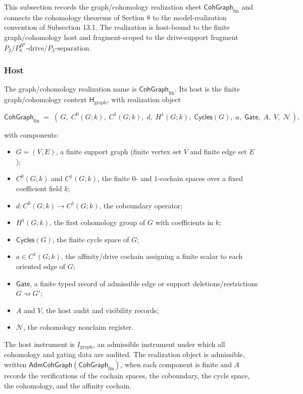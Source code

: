 \documentclass[11pt]{article}
\providecommand{\tightlist}{}
\theoremstyle{definition}
\begin{document}
This subsection records the graph/cohomology realization sheet \(\mathsf{CohGraph}_{\mathrm{fin}}\) and connects the cohomology theorems of Section 8 to the model-realization convention of Subsection 13.1. The realization is host-bound to the finite graph/cohomology host and fragment-scoped to the drive-support fragment \(P_2/P_6^{H^1}\text{-drive}/P_3\text{-separation}\).

\subsubsection{Host}

The graph/cohomology realization name is \(\mathsf{CohGraph}_{\mathrm{fin}}\). Its host is the finite graph/cohomology context \(\mathsf H_{\mathrm{graph}}\), with realization object

\[
\mathsf{CohGraph}_{\mathrm{fin}}\;=\;(\,G,\;C^{0}(G;k),\;C^{1}(G;k),\;d,\;H^{1}(G;k),\;\mathsf{Cycles}(G),\;a,\;\mathsf{Gate},\;A,\;V,\;\mathcal N\,),
\]

with components:

\begin{itemize}
\tightlist
\item
  \(G=(V,E)\), a finite support graph (finite vertex set \(V\) and finite edge set \(E\));
\item
  \(C^{0}(G;k)\) and \(C^{1}(G;k)\), the finite \(0\)- and \(1\)-cochain spaces over a fixed coefficient field \(k\);
\item
  \(d:C^{0}(G;k)\to C^{1}(G;k)\), the coboundary operator;
\item
  \(H^{1}(G;k)\), the first cohomology group of \(G\) with coefficients in \(k\);
\item
  \(\mathsf{Cycles}(G)\), the finite cycle space of \(G\);
\item
  \(a\in C^{1}(G;k)\), the affinity/drive cochain assigning a finite scalar to each oriented edge of \(G\);
\item
  \(\mathsf{Gate}\), a finite typed record of admissible edge or support deletions/restrictions \(G\rightsquigarrow G'\);
\item
  \(A\) and \(V\), the host audit and visibility records;
\item
  \(\mathcal N\), the cohomology nonclaim register.
\end{itemize}

The host instrument is \(I_{\mathrm{graph}}\), an admissible instrument under which all cohomology and gating data are audited. The realization object is admissible, written \(\mathsf{AdmCohGraph}(\mathsf{CohGraph}_{\mathrm{fin}})\), when each component is finite and \(A\) records the verifications of the cochain spaces, the coboundary, the cycle space, the cohomology, and the affinity cochain.
\end{document}
